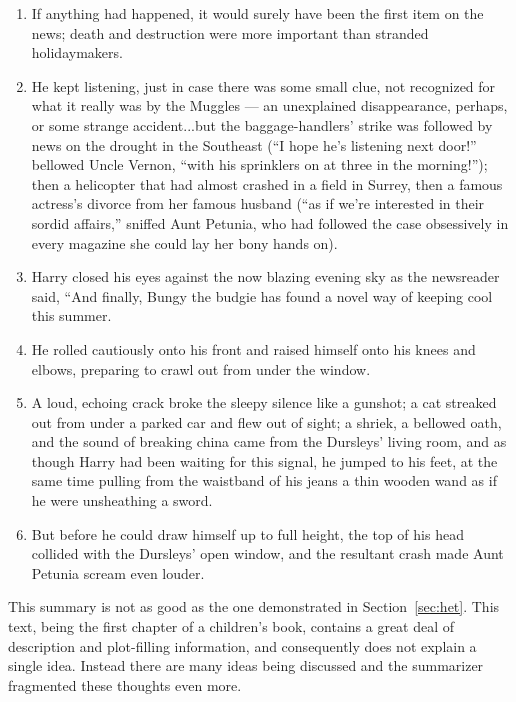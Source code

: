 \begin{enumerate}
	\item If anything had happened, it would surely have been the first item on the news; death and destruction were more important than stranded holidaymakers.
	
	\item He kept listening, just in case there was some small clue, not recognized for what it really was by the Muggles --- an unexplained disappearance, perhaps, or some strange accident...but the baggage-handlers' strike was followed by news on the drought in the Southeast (``I hope he's listening next door!'' bellowed Uncle Vernon, ``with his sprinklers on at three in the morning!''); then a helicopter that had almost crashed in a field in Surrey, then a famous actress's divorce from her famous husband (``as if we're interested in their sordid affairs,'' sniffed Aunt Petunia, who had followed the case obsessively in every magazine she could lay her bony hands on).
	
	\item Harry closed his eyes against the now blazing evening sky as the newsreader said, ``And finally, Bungy the budgie has found a novel way of keeping cool this summer.
	
	\item He rolled cautiously onto his front and raised himself onto his knees and elbows, preparing to crawl out from under the window.
	
	\item A loud, echoing crack broke the sleepy silence like a gunshot; a cat streaked out from under a parked car and flew out of sight; a shriek, a bellowed oath, and the sound of breaking china came from the Dursleys' living room, and as though Harry had been waiting for this signal, he jumped to his feet, at the same time pulling from the waistband of his jeans a thin wooden wand as if he were unsheathing a sword.
	
	\item But before he could draw himself up to full height, the top of his head collided with the Dursleys' open window, and the resultant crash made Aunt Petunia scream even louder.
\end{enumerate}

This summary is not as good as the one demonstrated in Section~\ref{sec:het}. This text, being the first chapter of a children's book, contains a great deal of description and plot-filling information, and consequently does not explain a single idea. Instead there are many ideas being discussed and the summarizer fragmented these thoughts even more. 


